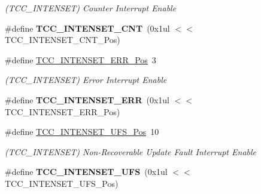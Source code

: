 \begin{DoxyCompactItemize}
\begin{DoxyCompactList}\small\item\em (T\+C\+C\+\_\+\+I\+N\+T\+E\+N\+S\+E\+T) Counter Interrupt Enable \end{DoxyCompactList}\item 
\hypertarget{group___s_a_m_l21___t_c_c_gac86f3d55609b7159045127ad4f7cc5bd}{}\#define {\bfseries T\+C\+C\+\_\+\+I\+N\+T\+E\+N\+S\+E\+T\+\_\+\+C\+N\+T}~(0x1ul $<$$<$ T\+C\+C\+\_\+\+I\+N\+T\+E\+N\+S\+E\+T\+\_\+\+C\+N\+T\+\_\+\+Pos)\label{group___s_a_m_l21___t_c_c_gac86f3d55609b7159045127ad4f7cc5bd}

\item 
\hypertarget{group___s_a_m_l21___t_c_c_ga5dbfe35de7ae404c1679096ee86c5ecc}{}\#define \hyperlink{group___s_a_m_l21___t_c_c_ga5dbfe35de7ae404c1679096ee86c5ecc}{T\+C\+C\+\_\+\+I\+N\+T\+E\+N\+S\+E\+T\+\_\+\+E\+R\+R\+\_\+\+Pos}~3\label{group___s_a_m_l21___t_c_c_ga5dbfe35de7ae404c1679096ee86c5ecc}

\begin{DoxyCompactList}\small\item\em (T\+C\+C\+\_\+\+I\+N\+T\+E\+N\+S\+E\+T) Error Interrupt Enable \end{DoxyCompactList}\item 
\hypertarget{group___s_a_m_l21___t_c_c_ga859bf20f5a52de3c25f9bbae49101e9a}{}\#define {\bfseries T\+C\+C\+\_\+\+I\+N\+T\+E\+N\+S\+E\+T\+\_\+\+E\+R\+R}~(0x1ul $<$$<$ T\+C\+C\+\_\+\+I\+N\+T\+E\+N\+S\+E\+T\+\_\+\+E\+R\+R\+\_\+\+Pos)\label{group___s_a_m_l21___t_c_c_ga859bf20f5a52de3c25f9bbae49101e9a}

\item 
\hypertarget{group___s_a_m_l21___t_c_c_gaf314df057e96270ce4866cdc198d64c9}{}\#define \hyperlink{group___s_a_m_l21___t_c_c_gaf314df057e96270ce4866cdc198d64c9}{T\+C\+C\+\_\+\+I\+N\+T\+E\+N\+S\+E\+T\+\_\+\+U\+F\+S\+\_\+\+Pos}~10\label{group___s_a_m_l21___t_c_c_gaf314df057e96270ce4866cdc198d64c9}

\begin{DoxyCompactList}\small\item\em (T\+C\+C\+\_\+\+I\+N\+T\+E\+N\+S\+E\+T) Non-\/\+Recoverable Update Fault Interrupt Enable \end{DoxyCompactList}\item 
\hypertarget{group___s_a_m_l21___t_c_c_gac4b0fd252f56ffbebbffaa74ff7f6f4c}{}\#define {\bfseries T\+C\+C\+\_\+\+I\+N\+T\+E\+N\+S\+E\+T\+\_\+\+U\+F\+S}~(0x1ul $<$$<$ T\+C\+C\+\_\+\+I\+N\+T\+E\+N\+S\+E\+T\+\_\+\+U\+F\+S\+\_\+\+Pos)\label{group___s_a_m_l21___t_c_c_gac4b0fd252f56ffbebbffaa74ff7f6f4c}


\end{DoxyCompactItemize}
